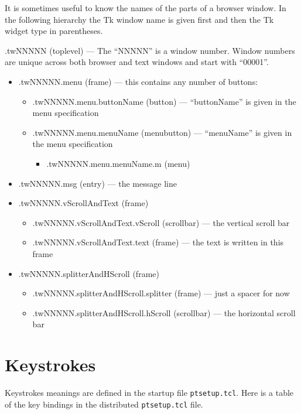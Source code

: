 It is sometimes useful to know the names of the parts of a browser
window.
In the following hierarchy the Tk window name is given first and
then the Tk widget type in parentheses.

.twNNNNN (toplevel) --- The ``NNNNN'' is a window number.
	Window numbers are unique across both browser
	and text windows and start with ``00001''.
	\begin{itemize}
	\item .twNNNNN.menu (frame) --- this contains any number of buttons:
		\begin{itemize}
		\item .twNNNNN.menu.buttonName (button) ---
			``buttonName'' is given in the menu specification
		\item .twNNNNN.menu.menuName (menubutton) ---
			``menuName'' is given in the menu specification
			\begin{itemize}
			\item .twNNNNN.menu.menuName.m (menu)
			\end{itemize}
		\end{itemize}
	\item .twNNNNN.msg (entry) --- the message line
	\item .twNNNNN.vScrollAndText (frame) 
		\begin{itemize}
		\item .twNNNNN.vScrollAndText.vScroll (scrollbar) ---
			the vertical scroll bar
		\item .twNNNNN.vScrollAndText.text (frame) --- the text
			is written in this frame
		\end{itemize}
	\item .twNNNNN.splitterAndHScroll (frame) 
		\begin{itemize}
		\item .twNNNNN.splitterAndHScroll.splitter (frame) --- just
			a spacer for now
		\item .twNNNNN.splitterAndHScroll.hScroll (scrollbar) ---
			the horizontal scroll bar
		\end{itemize}
	\end{itemize}







\section{Keystrokes} \label{sect:keys}

Keystrokes meanings are defined in the startup file {\tt ptsetup.tcl}.
Here is a table of the key bindings in the distributed {\tt ptsetup.tcl} file.

